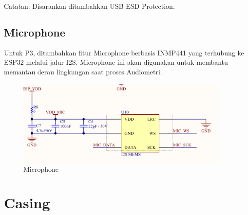 \documentclass{book} %
\begin{document}
	Catatan: Disarankan ditambahkan USB ESD Protection.
    
    \newpage
    \section{Microphone}
    
    Untuk P3, ditambahkan fitur Microphone berbasis INMP441 yang terhubung ke ESP32 melalui jalur I2S.
    Microphone ini akan digunakan untuk membantu memantau derau lingkungan saat proses Audiometri.
    
    \begin{figure}[!ht]
    	\centering
    	\includegraphics[width=300pt]{images/p3_mic}
    	\caption{Microphone}
    \end{figure}
    
    \chapter{Casing}
\end{document}
